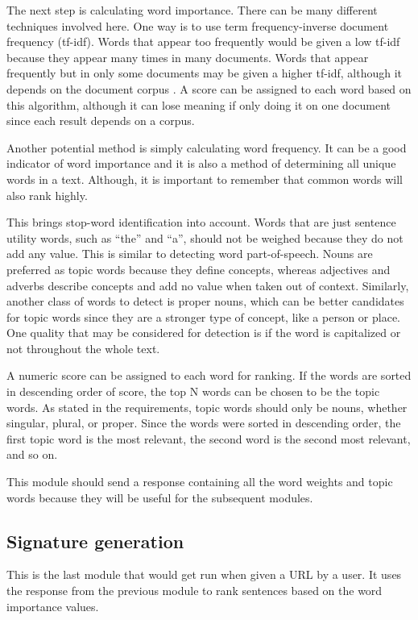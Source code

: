 \documentclass[11pt,titlepage]{report}
\begin{document}
The next step is calculating word importance. There can be many different techniques involved here. One way is to use term frequency-inverse document frequency (tf-idf). Words that appear too frequently would be given a low tf-idf because they appear many times in many documents. Words that appear frequently but in only some documents may be given a higher tf-idf, although it depends on the document corpus \cite{torres}. A score can be assigned to each word based on this algorithm, although it can lose meaning if only doing it on one document since each result depends on a corpus.

Another potential method is simply calculating word frequency. It can be a good indicator of word importance and it is also a method of determining all unique words in a text. Although, it is important to remember that common words will also rank highly.

This brings stop-word identification into account. Words that are just sentence utility words, such as ``the'' and ``a'', should not be weighed because they do not add any value. This is similar to detecting word part-of-speech. Nouns are preferred as topic words because they define concepts, whereas adjectives and adverbs describe concepts and add no value when taken out of context. Similarly, another class of words to detect is proper nouns, which can be better candidates for topic words since they are a stronger type of concept, like a person or place. One quality that may be considered for detection is if the word is capitalized or not throughout the whole text.

A numeric score can be assigned to each word for ranking. If the words are sorted in descending order of score, the top N words can be chosen to be the topic words. As stated in the requirements, topic words should only be nouns, whether singular, plural, or proper. Since the words were sorted in descending order, the first topic word is the most relevant, the second word is the second most relevant, and so on. 

This module should send a response containing all the word weights and topic words because they will be useful for the subsequent modules.

\subsection{Signature generation}
This is the last module that would get run when given a URL by a user. It uses the response from the previous module to rank sentences based on the word importance values. 
\end{document}
